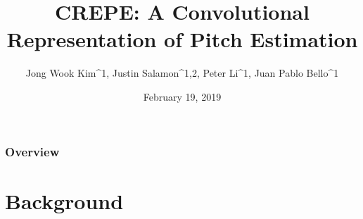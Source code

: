 \documentclass{beamer}
\title[CREPE]{CREPE: A Convolutional Representation of Pitch Estimation} %
\author{Jong Wook Kim^1, Justin Salamon^{1,2}, Peter Li^1, Juan Pablo Bello^1} %
\institute[University of Toronto] %
{
Music and Audio Research Laboratory, New York University\\
Center for Urban Science and Progress, New York University\\ %
\medskip
\text{ICASSP 2018 - Proceedings}\\
\medskip
\text{CSC2518, Sherry Wang} %
}
\date{February 19, 2019} %
\begin{document}
\begin{frame}
\titlepage %
\end{frame}

\begin{frame}
\frametitle{Overview} %
\tableofcontents %
\end{frame}


\section{Background} 
\end{document}
